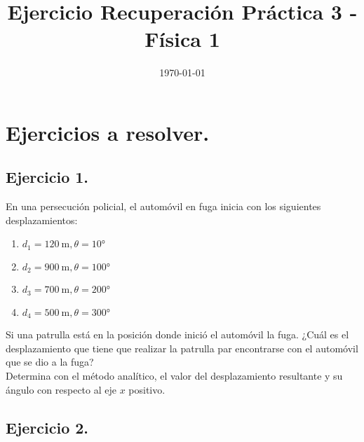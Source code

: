 \documentclass[14pt]{extarticle}
\title{\vspace*{-2cm} Ejercicio Recuperación Práctica 3 - Física 1\vspace{-5ex}}
\date{\today}
\begin{document}
\maketitle

\section{Ejercicios a resolver.}

\subsection{Ejercicio 1.}

En una persecución policial, el automóvil en fuga inicia con los siguientes desplazamientos:
\begin{enumerate}
\item $d_{1} = \SI{120}{\meter}, \theta = \ang{10}$
\item $d_{2} = \SI{900}{\meter}, \theta = \ang{100}$
\item $d_{3} = \SI{700}{\meter}, \theta = \ang{200}$
\item $d_{4} = \SI{500}{\meter}, \theta = \ang{300}$
\end{enumerate}
Si una patrulla está en la posición donde inició el automóvil la fuga. ¿Cuál es el desplazamiento que tiene que realizar la patrulla par encontrarse con el automóvil que se dio a la fuga?
\\
Determina con el método analítico, el valor del desplazamiento resultante y su ángulo con respecto al eje $x$ positivo.

\subsection{Ejercicio 2.}
\end{document}
